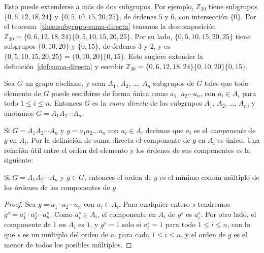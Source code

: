   Esto puede extenderse a más de dos subgrupos.
  Por ejemplo,
  \(\mathbb{Z}_{30}\)
  tiene subgrupos  \(\{0, 6, 12, 18, 24\}\) y \(\{0, 5, 10, 15, 20, 25\}\),
  de órdenes \(5\) y \(6\),
  con intersección \(\{0\}\).
  Por el teorema~\ref{theo:subgrupo-suma-directa}
  tenemos la descomposición
  \(\mathbb{Z}_{30} = \{0, 6, 12, 18, 24\} \{0, 5, 10, 15, 20, 25\}\).
  Por su lado,
  \(\{0, 5, 10, 15, 20, 25\}\) tiene subgrupos
  \(\{0, 10, 20\}\) y \(\{0, 15\}\),
  de órdenes \(3\) y \(2\),
  y es
  \(\{0, 5, 10, 15, 20, 25\} = \{0, 10, 20\} \{0, 15\}\).
  Esto sugiere extender la definición~\ref{def:suma-directa} y escribir
  \(\mathbb{Z}_{30} = \{0, 6, 12, 18, 24\}
       \{0, 10, 20\} \{0, 15\}\).
  \begin{definition}
    \label{def:suma-directa-n}
    Sea \(G\) un grupo abeliano,
    y sean \(A_1\), \(A_2\), \ldots, \(A_n\) subgrupos de \(G\)
    tales que todo elemento de \(G\) puede escribirse de forma única
    como \(a_1 \cdot a_2 \dotsm a_n\),
    con \(a_i \in A_i\) para todo \(1 \le i \le n\).
    Entonces \(G\) es la \emph{suma directa}
    de los subgrupos \(A_1\), \(A_2\), \ldots, \(A_n\),
    y anotamos \(G = A_1 A_2 \dotsb A_n\).
  \end{definition}
  Si \(G = A_1 A_2 \dotsb A_n\)
  y \(g = a_1 a_2 \dotso a_n\) con \(a_i \in A_i\)
  decimos que \(a_i\) es el \emph{componente} de \(g\) en \(A_i\).
  Por la definición de suma directa
  el componente de \(g\) en \(A_i\) es único.
  Una relación útil entre el orden del elemento
  y los órdenes de sus componentes es la siguiente:
  \begin{theorem}
    \label{theo:ordenes-suma-directa}
    Si \(G = A_1 A_2 \dotsb A_n\) y \(g \in G\),
    entonces el orden de \(g\)
    es el mínimo común múltiplo de los órdenes de los componentes de \(g\)
  \end{theorem}
  \begin{proof}
    Sea \(g = a_1 \cdot a_2 \dotsm a_n\) con \(a_i \in A_i\).
    Para cualquier entero \(s\)
    tendremos \(g^s = a_1^s \cdot a_2^s \dotsm a_n^s\).
    Como \(a_i^s \in A_i\),
    el componente en \(A_i\) de \(g^s\) es \(a_i^s\).
    Por otro lado,
    el componente de \(1\) en \(A_i\) es \(1\),
    y \(g^s = 1\) solo si \(a_i^s = 1\) para todo \(1 \le i \le n\),
    con lo que \(s\) es un múltiplo del orden de \(a_i\)
    para cada \(1 \le i \le n\),
    y el orden de \(g\) es el menor de todos los posibles múltiplos.
  \end{proof}

